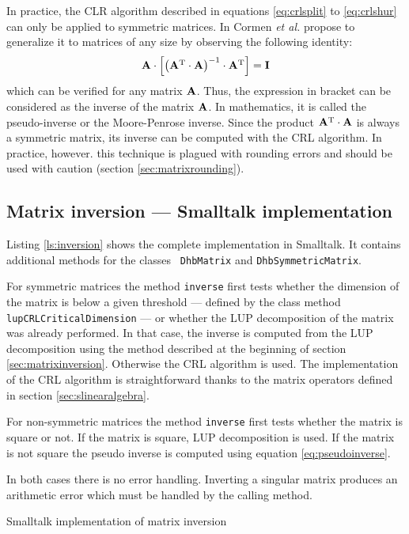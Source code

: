 \documentclass[twoside]{book}
\begin{document}
In practice, the CLR algorithm described in equations
\ref{eq:crlsplit} to \ref{eq:crlshur} can only be applied to
symmetric matrices. In \cite{CorLeiRiv} Cormen {\it et al.}
propose to generalize it to matrices of any size by observing the
following identity:
\begin{equation}
\label{eq:pseudoinverse}
  {\bf A}\cdot\left[\left({\bf A}^{\mathop{\rm T}}\cdot{\bf A}\right)^{-1}\cdot{\bf A}^{\mathop{\rm T}}\right]={\bf I}
\end{equation}
which can be verified for any matrix ${\bf A}$. Thus, the
expression in bracket can be considered as the inverse of the
matrix ${\bf A}$. In mathematics, it is called the pseudo-inverse
or the Moore-Penrose inverse. Since the product
${\bf A}^{\mathop{\rm T}}\cdot{\bf A}$ is always a symmetric matrix, its
inverse can be computed with the CRL algorithm. In practice,
however. this technique is plagued with rounding errors and should
be used with caution (\cf section \ref{sec:matrixrounding}).

\subsection{Matrix inversion --- Smalltalk implementation}
Listing \ref{ls:inversion} shows the complete implementation in
Smalltalk. It contains additional methods for the classes {\tt
DhbMatrix} and {\tt DhbSymmetricMatrix}.

For symmetric matrices the method {\tt inverse} first tests
whether the dimension of the matrix is below a given threshold ---
defined by the class method {\tt lupCRLCriticalDimension} --- or
whether the LUP decomposition of the matrix was already performed.
In that case, the inverse is computed from the LUP decomposition
using the method described at the beginning of section
\ref{sec:matrixinversion}. Otherwise the CRL algorithm is used.
The implementation of the CRL algorithm is straightforward thanks
to the matrix operators defined in section
\ref{sec:slinearalgebra}.

For non-symmetric matrices the method {\tt inverse} first tests
whether the matrix is square or not. If the matrix is square, LUP
decomposition is used. If the matrix is not square the pseudo
inverse is computed using equation \ref{eq:pseudoinverse}.

In both cases there is no error handling. Inverting a singular
matrix produces an arithmetic error which must be handled by the
calling method.

\begin{listing} Smalltalk implementation of matrix inversion \label{ls:inversion}


\end{listing}
\end{document}
